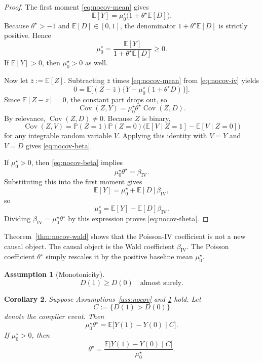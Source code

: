 \documentclass[11pt]{article}
\numberwithin{equation}{section}
\newcommand{\E}{\mathbb E}
\newcommand{\PP}{\mathbb P}
\newcommand{\1}{\mathbf 1}
\DeclareMathOperator{\Cov}{Cov}
\newtheorem{assumption}{Assumption}[section]
\newtheorem{corollary}[assumption]{Corollary}
\theoremstyle{remark}
\begin{document}
\begin{proof}
The first moment \eqref{eq:nocov-mean} gives
\[
\E[Y] = \mu_0^\star\bigl(1+\theta^\star\E[D]\bigr).
\]
Because $\theta^\star>-1$ and $\E[D]\in[0,1]$, the denominator
$1+\theta^\star\E[D]$ is strictly positive. Hence
\[
\mu_0^\star = \frac{\E[Y]}{1+\theta^\star\E[D]} \ge 0.
\]
If $\E[Y]>0$, then $\mu_0^\star>0$ as well.

Now let $\bar z := \E[Z]$. Subtracting $\bar z$ times \eqref{eq:nocov-mean} from
\eqref{eq:nocov-iv} yields
\[
0 = \E\bigl[(Z-\bar z)\{Y-\mu_0^\star(1+\theta^\star D)\}\bigr].
\]
Since $\E[Z-\bar z]=0$, the constant part drops out, so
\[
\Cov(Z,Y) = \mu_0^\star\theta^\star\Cov(Z,D).
\]
By relevance, $\Cov(Z,D)\neq 0$. Because $Z$ is binary,
\[
\Cov(Z,V) = \PP(Z=1)\PP(Z=0)\bigl(\E[V\mid Z=1]-\E[V\mid Z=0]\bigr)
\]
for any integrable random variable $V$. Applying this identity with $V=Y$ and $V=D$
gives \eqref{eq:nocov-beta}.

If $\mu_0^\star>0$, then \eqref{eq:nocov-beta} implies
\[
\mu_0^\star\theta^\star = \beta_{\mathrm{IV}}.
\]
Substituting this into the first moment gives
\[
\E[Y] = \mu_0^\star + \E[D]\beta_{\mathrm{IV}},
\]
so
\[
\mu_0^\star = \E[Y]-\E[D]\beta_{\mathrm{IV}}.
\]
Dividing $\beta_{\mathrm{IV}}=\mu_0^\star\theta^\star$ by this expression proves
\eqref{eq:nocov-theta}.
\end{proof}

Theorem~\ref{thm:nocov-wald} shows that the Poisson-IV coefficient is not a new causal
object. The causal object is the Wald coefficient $\beta_{\mathrm{IV}}$. The Poisson
coefficient $\theta^\star$ simply rescales it by the positive baseline mean $\mu_0^\star$.

\begin{assumption}[Monotonicity]\label{ass:mono-nocov}
\[
D(1) \ge D(0) \quad \text{almost surely.}
\]
\end{assumption}

\begin{corollary}\label{cor:nocov-late}
Suppose Assumptions~\ref{ass:nocov} and \ref{ass:mono-nocov} hold. Let
\[
C := \{D(1)>D(0)\}
\]
denote the complier event. Then
\begin{equation}\label{eq:nocov-late}
\mu_0^\star\theta^\star = \E\bigl[Y(1)-Y(0)\mid C\bigr].
\end{equation}
If $\mu_0^\star>0$, then
\begin{equation}\label{eq:nocov-late-theta}
\theta^\star
= \frac{\E\bigl[Y(1)-Y(0)\mid C\bigr]}{\mu_0^\star}.
\end{equation}
\end{corollary}
\end{document}
